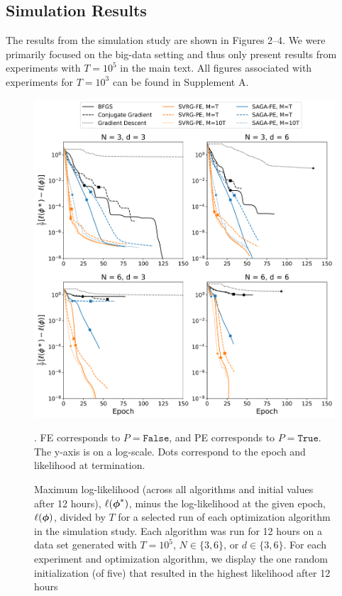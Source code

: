\subsection{Simulation Results}

The results from the simulation study are shown in Figures 2--4. We were primarily focused on the big-data setting and thus only present results from experiments with $T=10^5$ in the main text. All figures associated with experiments for $T=10^3$ can be found in Supplement A.

\begin{figure}%
    \centering
    \includegraphics[width=5.5in]{../plt/log-like_v_epoch_T-100000-000.png}
    \caption{
    Maximum log-likelihood (across all algorithms and initial values after 12 hours), $\ell(\boldsymbol{\phi}^*)$, minus the log-likelihood at the given epoch, $\ell(\boldsymbol{\phi})$, divided by $T$ for a selected run of each optimization algorithm in the simulation study. 
    Each algorithm was run for 12 hours on a data set generated with $T=10^{5}$, $N \in \{3,6\}$, or $d \in \{3,6\}$. For each experiment and optimization algorithm, we display the one random initialization (of five) that resulted in the highest likelihood after 12 hours}. FE corresponds to $P = \texttt{False}$, and PE corresponds to $P = \texttt{True}$. The y-axis is on a log-scale. Dots correspond to the epoch and likelihood at termination. 
    \label{fig:ll_trace_sim}
\end{figure}
